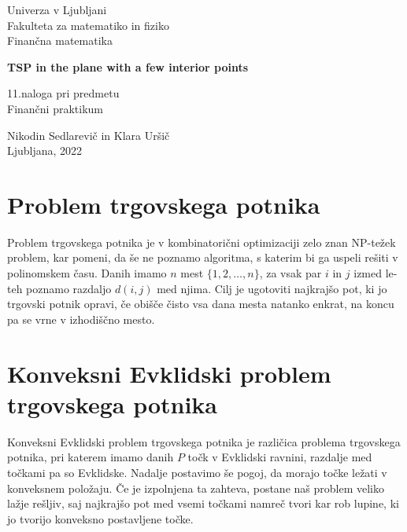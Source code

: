 \documentclass[a4paper, 11pt]{article}
\begin{document}
\begin{titlepage}
    \begin{center}
        \Large
        Univerza v Ljubljani\\
        Fakulteta za matematiko in fiziko\\
        Finančna matematika\\

        \vspace*{6cm}
        
        \Huge
        \textbf{TSP in the plane with a few interior points}

        \vspace*{3cm}

        \Large
        11.naloga pri predmetu\\
        Finančni praktikum

        \vspace*{5cm}

        \Large
        Nikodin Sedlarevič in Klara Uršič\\
        Ljubljana, 2022
    \end{center}
\end{titlepage}

\section*{Problem trgovskega potnika}

Problem trgovskega potnika je v kombinatorični optimizaciji zelo znan NP-težek problem, kar pomeni, da še ne poznamo algoritma,
s katerim bi ga uspeli rešiti v polinomskem času. Danih imamo $n$ mest $\{1,2,\dots,n\}$, za vsak par $i$ in $j$ izmed 
le-teh poznamo razdaljo $d(i,j)$ med njima. Cilj je ugotoviti najkrajšo pot, ki jo trgovski potnik opravi, če obišče čisto vsa 
dana mesta natanko enkrat, na koncu pa se vrne v izhodiščno mesto.

\section*{Konveksni Evklidski problem trgovskega potnika}

Konveksni Evklidski problem trgovskega potnika je različica problema trgovskega potnika, pri katerem imamo danih $P$ točk v Evklidski 
ravnini, razdalje med točkami pa so Evklidske. Nadalje postavimo še pogoj, da morajo točke ležati v konveksnem položaju. Če je 
izpolnjena ta zahteva, postane naš problem veliko lažje rešljiv, saj najkrajšo pot med vsemi točkami namreč tvori kar rob lupine, ki jo
tvorijo konveksno postavljene točke.
\end{document}
